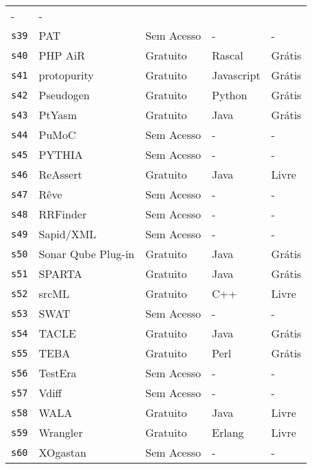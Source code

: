 \begin{longtable}{l l l p{3cm} l}
      - &
      - \\
    \texttt{s39} &
      PAT &
      Sem Acesso &
      - &
      - \\
    \texttt{s40} &
      PHP AiR &
      Gratuito &
      Rascal &
      Grátis \\
    \texttt{s41} &
      protopurity &
      Gratuito &
      Javascript &
      Grátis \\
    \texttt{s42} &
      Pseudogen &
      Gratuito &
      Python &
      Grátis \\
    \texttt{s43} &
      PtYasm &
      Gratuito &
      Java &
      Grátis \\
    \texttt{s44} &
      PuMoC &
      Sem Acesso &
      - &
      - \\
    \texttt{s45} &
      PYTHIA &
      Sem Acesso &
      - &
      - \\
    \texttt{s46} &
      ReAssert &
      Gratuito &
      Java &
      Livre \\
    \texttt{s47} &
      Rêve &
      Sem Acesso &
      - &
      - \\
    \texttt{s48} &
      RRFinder &
      Sem Acesso &
      - &
      - \\
    \texttt{s49} &
      Sapid/XML &
      Sem Acesso &
      - &
      - \\
    \texttt{s50} &
      Sonar Qube Plug-in &
      Gratuito &
      Java &
      Grátis \\
    \texttt{s51} &
      SPARTA &
      Gratuito &
      Java &
      Grátis \\
    \texttt{s52} &
      srcML &
      Gratuito &
      C++ &
      Livre \\
    \texttt{s53} &
      SWAT &
      Sem Acesso &
      - &
      - \\
    \texttt{s54} &
      TACLE &
      Gratuito &
      Java &
      Grátis \\
    \texttt{s55} &
      TEBA &
      Gratuito &
      Perl &
      Grátis \\
    \texttt{s56} &
      TestEra &
      Sem Acesso &
      - &
      - \\
    \texttt{s57} &
      Vdiff &
      Sem Acesso &
      - &
      - \\
    \texttt{s58} &
      WALA &
      Gratuito &
      Java &
      Livre \\
    \texttt{s59} &
      Wrangler &
      Gratuito &
      Erlang &
      Livre \\
    \texttt{s60} &
      XOgastan &
      Sem Acesso &
      - &
      - \\
  \hline
\end{longtable}
